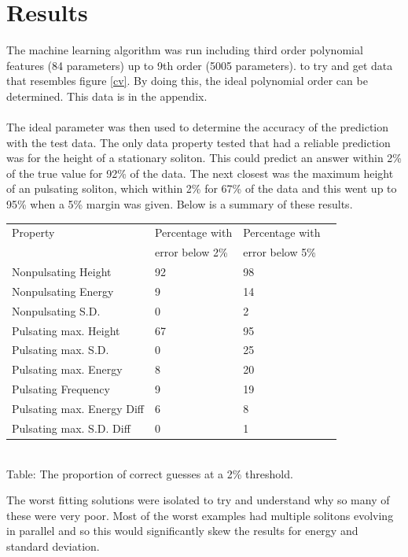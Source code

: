 \documentclass[a4paper,12pt]{report}
\begin{document}
\section{Results}
The machine learning algorithm was run including third order polynomial features (84 parameters) up to 9th order (5005 parameters). to try and get data that resembles figure \ref{cv}. By doing this, the ideal polynomial order can be determined. This data is in the appendix. 
\\\\
The ideal parameter was then used to determine the accuracy of the prediction with the test data. The only data property tested that had a reliable prediction was for the height of a stationary soliton. This could predict an answer within 2\% of the true value for 92\% of the data. The next closest was the maximum height of an pulsating soliton, which within 2\% for 67\% of the data and this went up to 95\% when a 5\% margin was given. Below is a summary of these results.
\begin{center}
\begin{tabular}{|l|l|l|l|}
\hline
Property & Percentage with & Percentage with\\ %
 &  error below 2\% & error below 5\% \\%
\hline
Nonpulsating Height&92&98\\
Nonpulsating Energy&9&14\\
Nonpulsating S.D.&0&2\\
Pulsating max. Height&67&95\\
Pulsating max. S.D.&0&25\\
Pulsating max. Energy&8&20\\
Pulsating Frequency&9&19\\
Pulsating max. Energy Diff&6&8\\
Pulsating max. S.D. Diff &0&1\\
\hline
\end{tabular}
\\Table: The proportion of correct guesses at a 2\% threshold.
\end{center}
The worst fitting solutions were isolated to try and understand why so many of these were very poor. Most of the worst examples had multiple solitons evolving in parallel and so this would significantly skew the results for energy and standard deviation.
\\\\
\end{document}
